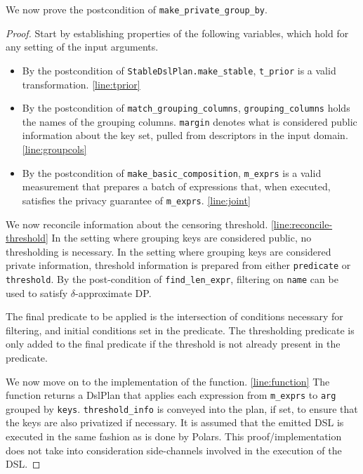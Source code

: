 \documentclass{article}
\begin{document}
We now prove the postcondition of \texttt{make\_private\_group\_by}.
\begin{proof}

Start by establishing properties of the following variables, 
which hold for any setting of the input arguments.

\begin{itemize}
    \item By the postcondition of \texttt{StableDslPlan.make\_stable}, \texttt{t\_prior} is a valid transformation. \ref{line:tprior}
    \item By the postcondition of \texttt{match\_grouping\_columns}, \texttt{grouping\_columns} holds the names of the grouping columns.
        \texttt{margin} denotes what is considered public information about the key set, 
        pulled from descriptors in the input domain. \ref{line:groupcols}
    \item By the postcondition of \texttt{make\_basic\_composition}, 
        \texttt{m\_exprs} is a valid measurement that prepares a batch of expressions that, 
        when executed, satisfies the privacy guarantee of \texttt{m\_exprs}.  \ref{line:joint}
\end{itemize}

We now reconcile information about the censoring threshold. \ref{line:reconcile-threshold}
In the setting where grouping keys are considered public, no thresholding is necessary.
In the setting where grouping keys are considered private information,
threshold information is prepared from either \texttt{predicate} or \texttt{threshold}.
By the post-condition of \texttt{find\_len\_expr}, filtering on \texttt{name} can be used to satisfy 
$\delta$-approximate DP.

The final predicate to be applied is the intersection of conditions necessary for filtering, 
and initial conditions set in the predicate.
The thresholding predicate is only added to the final predicate 
if the threshold is not already present in the predicate.

We now move on to the implementation of the function. \ref{line:function}
The function returns a DslPlan that applies each expression from \texttt{m\_exprs}
to \texttt{arg} grouped by \texttt{keys}.
\texttt{threshold\_info} is conveyed into the plan, if set, 
to ensure that the keys are also privatized if necessary.
It is assumed that the emitted DSL is executed in the same fashion as is done by Polars.
This proof/implementation does not take into consideration side-channels involved in the execution of the DSL.


\end{proof}
\end{document}
